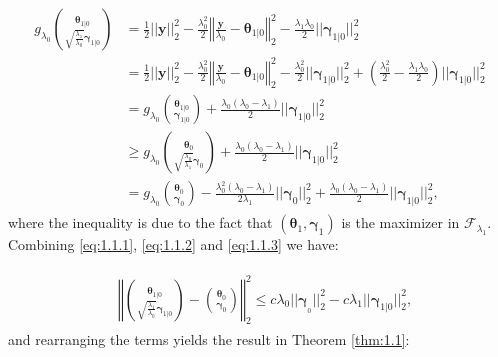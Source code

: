 \begin{gather}
    \label{eq:1.1.3}
    \begin{aligned}
        g_{\lambda_0}\binom{\boldsymbol\theta_{1|0}}{\sqrt{\frac{\lambda_1}{\lambda_0}}\boldsymbol\gamma_{1|0}}&=\frac{1}{2}||\boldsymbol y||_2^2-\frac{\lambda_0^2}{2}\left\Vert\frac{\boldsymbol y}{\lambda_0}-\boldsymbol\theta_{1|0}\right\Vert_2^2-\frac{\lambda_1\lambda_0}{2}||\boldsymbol\gamma_{1|0}||_2^2\\
        &= \frac{1}{2}||\boldsymbol y||_2^2-\frac{\lambda_0^2}{2}\left\Vert\frac{\boldsymbol y}{\lambda_0}-\boldsymbol\theta_{1|0}\right\Vert_2^2-\frac{\lambda_0^2}{2}||\boldsymbol\gamma_{1|0}||_2^2+\left(\frac{\lambda_0^2}{2}-\frac{\lambda_1\lambda_0}{2}\right)||\boldsymbol\gamma_{1|0}||_2^2\\
        &=g_{\lambda_0}\binom{\boldsymbol\theta_{1|0}}{\boldsymbol\gamma_{1|0}}+\frac{\lambda_0(\lambda_0-\lambda_1)}{2}||\boldsymbol\gamma_{1|0}||_2^2\\
        &\geq g_{\lambda_0}\binom{\boldsymbol\theta_{0}}{\sqrt{\frac{\lambda_0}{\lambda_1}}\boldsymbol\gamma_{0}}+\frac{\lambda_0(\lambda_0-\lambda_1)}{2}||\boldsymbol\gamma_{1|0}||_2^2\\
        &=g_{\lambda_0}\binom{\boldsymbol\theta_{0}}{\boldsymbol\gamma_{0}}-\frac{\lambda_0^2(\lambda_0-\lambda_1)}{2\lambda_1}||\boldsymbol\gamma_{0}||_2^2+\frac{\lambda_0(\lambda_0-\lambda_1)}{2}||\boldsymbol\gamma_{1|0}||_2^2,
    \end{aligned}
\end{gather}
where the inequality is due to the fact that $(\boldsymbol\theta_{1},\boldsymbol\gamma_{1})$ is the maximizer in $\mathcal{F}_{\lambda_1}$. Combining \eqref{eq:1.1.1}, \eqref{eq:1.1.2} and \eqref{eq:1.1.3} we have:

\begin{gather}
    \begin{aligned}
        &\left\Vert\binom{\boldsymbol\theta_{1|0}}{\sqrt{\frac{\lambda_1}{\lambda_0}}\boldsymbol\gamma_{1|0}}-\binom{\boldsymbol\theta_{0}}{\boldsymbol\gamma_{0}}\right\Vert_2^2\leq c\lambda_0||\boldsymbol\gamma_{_0}||_2^2-c\lambda_1||\boldsymbol\gamma_{1|0}||_2^2,
    \end{aligned}
\end{gather}
and rearranging the terms yields the result in Theorem \ref{thm:1.1}:

